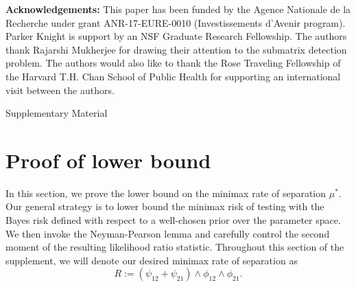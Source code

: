 \documentclass{article}
\theoremstyle{remark}
\begin{document}
\textbf{Acknowledgements:} This paper has been funded by the Agence Nationale de la Recherche under grant ANR-17-EURE-0010 (Investissements d'Avenir program). Parker Knight is support by an NSF Graduate Research Fellowship. The authors thank Rajarshi Mukherjee for drawing their attention to the submatrix detection problem. The authors would also like to thank the Rose Traveling Fellowship of the Harvard T.H. Chan School of Public Health for supporting an international visit between the authors. 





\newpage

\appendix 

\begin{center}
    \LARGE{Supplementary Material}
\end{center}

\tableofcontents

\section{Proof of lower bound}

In this section, we prove the lower bound on the minimax rate of separation $\mu^*$. Our general strategy is to lower bound the minimax risk of testing with the Bayes risk defined with respect to a well-chosen prior over the parameter space. We then invoke the Neyman-Pearson lemma and carefully control the second moment of the resulting likelihood ratio statistic. Throughout this section of the supplement, we will denote our desired minimax rate of separation as
\[R := (\psi_{12} + \psi_{21}) \land \phi_{12} \land \phi_{21}.\]
\end{document}
